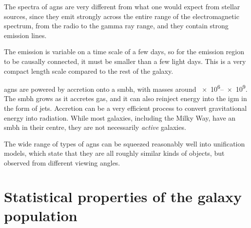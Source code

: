The spectra of \acp{agn} are very different from what one would expect from stellar sources, since they emit strongly across the entire range of the electromagnetic spectrum, from the radio to the gamma ray range, and they contain strong emission lines.

The emission is variable on a time scale of a few days, so for the emission region to be causally connected, it must be smaller than a few light days.
This is a very compact length scale compared to the rest of the galaxy.

\Acp{agn} are powered by accretion onto a \ac{smbh}, with masses around \SIrange{e6}{e9}{\solarmass}.
The \ac{smbh} grows as it accretes gas, and it can also reinject energy into the \ac{igm} in the form of jets.
Accretion can be a very efficient process to convert gravitational energy into radiation.
While most galaxies, including the Milky Way, have an \ac{smbh} in their centre, they are not necessarily \emph{active} galaxies.

The wide range of types of \acp{agn} can be squeezed reasonably well into unification models, which state that they are all roughly similar kinds of objects, but observed from different viewing angles.

\section{Statistical properties of the galaxy population}

